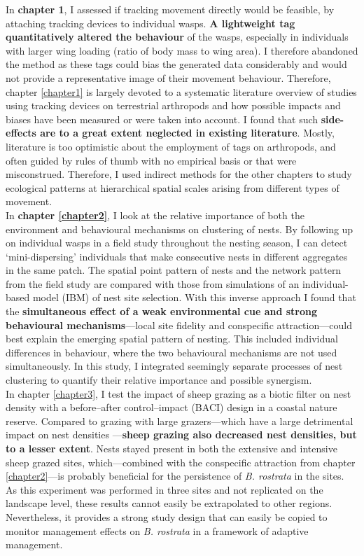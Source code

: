 \documentclass[10pt, twoside]{book} %
\begin{document}
	In \textbf{chapter 1}, I assessed if tracking movement directly would be feasible, by attaching tracking devices to individual wasps. \textbf{A lightweight tag quantitatively altered the behaviour} of the wasps, especially in individuals with larger wing loading (ratio of body mass to wing area). I therefore abandoned the method as these tags could bias the generated data considerably and would not provide a representative image of their movement behaviour. Therefore, chapter \ref{chapter1} is largely devoted to a systematic literature overview of studies using tracking devices on terrestrial arthropods and how possible impacts and biases have been measured or were taken into account. I found that such \textbf{side-effects are to a great extent neglected in existing literature}. Mostly, literature is too optimistic about the employment of tags on arthropods, and often guided by rules of thumb with no empirical basis or that were misconstrued. Therefore, I used indirect methods for the other chapters to study ecological patterns at hierarchical spatial scales arising from different types of movement.\\
	
	In \textbf{chapter \ref{chapter2}}, I look at the relative importance of both the environment and behavioural mechanisms on clustering of nests. By following up on individual wasps in a field study throughout the nesting season, I can detect `mini-dispersing' individuals that make consecutive nests in different aggregates in the same patch. The spatial point pattern of nests and the network pattern from the field study are compared with those from simulations of an individual-based model (IBM) of nest site selection. With this inverse approach I found that the \textbf{simultaneous effect of a weak environmental cue and strong behavioural mechanisms}---local site fidelity and conspecific attraction---could best explain the emerging spatial pattern of nesting. This included individual differences in behaviour, where the two behavioural mechanisms are not used simultaneously. In this study, I integrated seemingly separate processes of nest clustering to quantify their relative importance and possible synergism.\\
	
	In chapter \ref{chapter3}, I test the impact of sheep grazing as a biotic filter on nest density with a before--after control--impact (BACI) design in a coastal nature reserve. Compared to grazing with large grazers---which have a large detrimental impact on nest densities \citep{bonte2005}---\textbf{sheep grazing also decreased nest densities, but to a lesser extent}. Nests stayed present in both the extensive and intensive sheep grazed sites, which---combined with the conspecific attraction from chapter \ref{chapter2}---is probably beneficial for the persistence of \textit{B. rostrata} in the sites. As this experiment was performed in three sites and not replicated on the landscape level, these results cannot easily be extrapolated to other regions. Nevertheless, it provides a strong study design that can easily be copied to monitor management effects on \textit{B. rostrata} in a framework of adaptive management.\\
	
\end{document}
